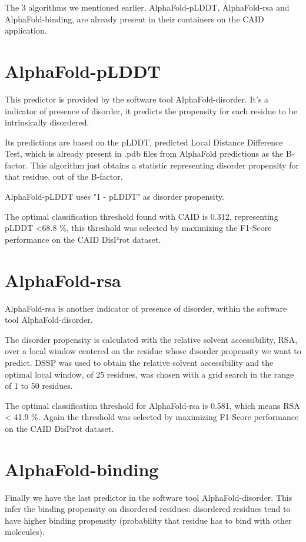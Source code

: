The 3 algorithms we mentioned earlier, AlphaFold-pLDDT, AlphaFold-rsa and AlphaFold-binding, are already present in their containers on the CAID application.

\section{AlphaFold-pLDDT}
This predictor is provided by the software tool AlphaFold-disorder. It's a indicator of presence of disorder, it predicts the propensity for each residue to be intrinsically disordered.

Its predictions are based on the pLDDT, predicted Local Distance Difference Test, which is already present in .pdb files from AlphaFold predictions as the B-factor. This algorithm just obtains a statistic representing disorder propensity for that residue, out of the B-factor.

AlphaFold-pLDDT uses "1 - pLDDT" as disorder propensity. 

The optimal classification threshold found with CAID is 0.312, representing pLDDT <68.8 \%, this threshold was selected by maximizing the F1-Score performance on the CAID DisProt dataset.
\section{AlphaFold-rsa}


AlphaFold-rsa is another indicator of presence of disorder, within the software tool AlphaFold-disorder.

The disorder propensity is calculated with the relative solvent accessibility, RSA, over a local window centered on the residue whose disorder propensity we want to predict. DSSP was used to obtain the relative solvent accessibility and the optimal local window, of 25 residues, was chosen with a grid search in the range of 1 to 50 residues.

The optimal classification threshold for AlphaFold-rsa is 0.581, which means RSA < 41.9 \%. Again the threshold was selected by maximizing F1-Score performance on the CAID DisProt dataset.

\section{AlphaFold-binding}
Finally we have the last predictor in the software tool AlphaFold-disorder. This infer the binding propensity on disordered residues: disordered residues tend to have higher binding propensity (probability that residue has to bind with other molecules).

